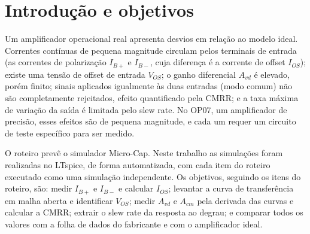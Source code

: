 \section{Introdução e objetivos}
\label{sec:objetivos}

Um amplificador operacional real apresenta desvios em relação ao modelo
ideal. Correntes contínuas de pequena magnitude circulam pelos terminais
de entrada (as correntes de polarização $I_{B+}$ e $I_{B-}$, cuja
diferença é a corrente de offset $I_{OS}$); existe uma tensão de offset
de entrada $V_{OS}$; o ganho diferencial $A_{vd}$ é elevado, porém
finito; sinais aplicados igualmente às duas entradas (modo comum) não
são completamente rejeitados, efeito quantificado pela CMRR; e a taxa
máxima de variação da saída é limitada pelo slew rate. No OP07, um
amplificador de precisão, esses efeitos são de pequena magnitude, e
cada um requer um circuito de teste específico para ser medido.

O roteiro prevê o simulador Micro-Cap. Neste trabalho as simulações
foram realizadas no LTspice, de forma automatizada, com cada item do
roteiro executado como uma simulação independente. Os objetivos, seguindo os itens do
roteiro, são: medir $I_{B+}$ e $I_{B-}$ e calcular $I_{OS}$; levantar a
curva de transferência em malha aberta e identificar $V_{OS}$; medir
$A_{vd}$ e $A_{cm}$ pela derivada das curvas e calcular a CMRR; extrair
o slew rate da resposta ao degrau; e comparar todos os valores com a
folha de dados do fabricante e com o amplificador ideal.
